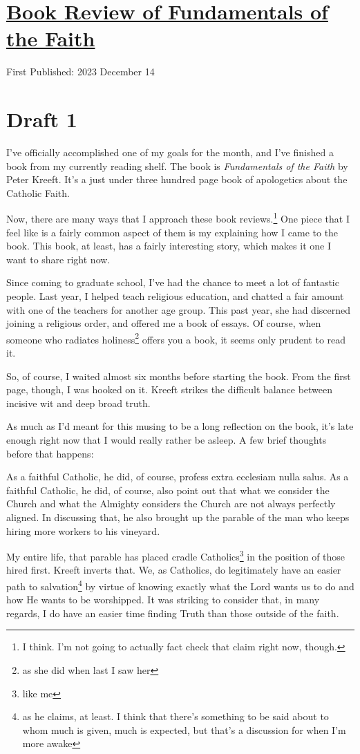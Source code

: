 \documentclass[12pt]{article}[titlepage]
\newcommand{\1}{\={a}}
\newcommand{\2}{\={e}}
\newcommand{\3}{\={\i}}
\newcommand{\4}{\=o}
\newcommand{\5}{\=u}
\newcommand{\6}{\={A}}
\renewcommand{\,}{\textsuperscript{,}}
\begin{document}
\doublespacing
\section{\href{book-review-fundamentals-faith.html}{Book Review of Fundamentals of the Faith}}
First Published: 2023 December 14
\section{Draft 1}
I've officially accomplished one of my goals for the month, and I've finished a book from my currently reading shelf.
The book is \textit{Fundamentals of the Faith} by Peter Kreeft.
It's a just under three hundred page book of apologetics about the Catholic Faith.

Now, there are many ways that I approach these book reviews.\footnote{I think. I'm not going to actually fact check that claim right now, though.}
One piece that I feel like is a fairly common aspect of them is my explaining how I came to the book.
This book, at least, has a fairly interesting story, which makes it one I want to share right now.

Since coming to graduate school, I've had the chance to meet a lot of fantastic people.
Last year, I helped teach religious education, and chatted a fair amount with one of the teachers for another age group.
This past year, she had discerned joining a religious order, and offered me a book of essays.
Of course, when someone who radiates holiness\footnote{as she did when last I saw her} offers you a book, it seems only prudent to read it.

So, of course, I waited almost six months before starting the book.
From the first page, though, I was hooked on it.
Kreeft strikes the difficult balance between incisive wit and deep broad truth.

As much as I'd meant for this musing to be a long reflection on the book, it's late enough right now that I would really rather be asleep.
A few brief thoughts before that happens:

As a faithful Catholic, he did, of course, profess extra ecclesiam nulla salus.
As a faithful Catholic, he did, of course, also point out that what we consider the Church and what the Almighty considers the Church are not always perfectly aligned.
In discussing that, he also brought up the parable of the man who keeps hiring more workers to his vineyard.

My entire life, that parable has placed cradle Catholics\footnote{like me} in the position of those hired first.
Kreeft inverts that.
We, as Catholics, do legitimately have an easier path to salvation\footnote{as he claims, at least. I think that there's something to be said about to whom much is given, much is expected, but that's a discussion for when I'm more awake} by virtue of knowing exactly what the Lord wants us to do and how He wants to be worshipped.
It was striking to consider that, in many regards, I do have an easier time finding Truth than those outside of the faith.
\end{document}
